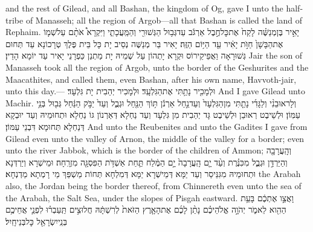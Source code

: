 {and the rest of Gilead, and all Bashan, the kingdom of Og, gave I unto the half-tribe of Manasseh; all the region of Argob—all that Bashan is called the land of Rephaim.}{}
{יָאִ֣יר בֶּן\maqqaf מְנַשֶּׁ֗ה לָקַח֙ אֶת\maqqaf כׇּל\maqqaf חֶ֣בֶל אַרְגֹּ֔ב עַד\maqqaf גְּב֥וּל הַגְּשׁוּרִ֖י וְהַמַּֽעֲכָתִ֑י וַיִּקְרָא֩ אֹתָ֨ם עַל\maqqaf שְׁמ֤וֹ אֶת\maqqaf הַבָּשָׁן֙ חַוֺּ֣ת יָאִ֔יר עַ֖ד הַיּ֥וֹם הַזֶּֽה׃}
{יָאִיר בַּר מְנַשֶּׁה נְסֵיב יָת כָּל בֵּית פֶּלֶךְ טְרָכוֹנָא עַד תְּחוּם גְּשׁוּרָאָה וַאֲפֵיקֵירוֹס וּקְרָא יָתְהוֹן עַל שְׁמֵיהּ יָת מַתְנַן כַּפְרָנֵי יָאִיר עַד יוֹמָא הָדֵין׃}
{Jair the son of Manasseh took all the region of Argob, unto the border of the Geshurites and the Maacathites, and called them, even Bashan, after his own name, Havvoth-jair, unto this day.—}{}
{וּלְמָכִ֖יר נָתַ֥תִּי אֶת\maqqaf הַגִּלְעָֽד׃}
{וּלְמָכִיר יְהַבִית יָת גִּלְעָד׃}
{And I gave Gilead unto Machir.}{}
{וְלָראוּבֵנִ֨י וְלַגָּדִ֜י נָתַ֤תִּי מִן\maqqaf הַגִּלְעָד֙ וְעַד\maqqaf נַ֣חַל אַרְנֹ֔ן תּ֥וֹךְ הַנַּ֖חַל וּגְבֻ֑ל וְעַד֙ יַבֹּ֣ק הַנַּ֔חַל גְּב֖וּל בְּנֵ֥י עַמּֽוֹן׃}
{וּלְשֵׁיבֶט רְאוּבֵן וּלְשֵׁיבֶט גָּד יְהַבִית מִן גִּלְעָד וְעַד נַחְלָא דְּאַרְנוֹן גּוֹ נַחְלָא וּתְחוּמֵיהּ וְעַד יוּבְקָא דְּנַחְלָא תְּחוּמָא דִּבְנֵי עַמּוֹן׃}
{And unto the Reubenites and unto the Gadites I gave from Gilead even unto the valley of Arnon, the middle of the valley for a border; even unto the river Jabbok, which is the border of the children of Ammon;}{}
{וְהָֽעֲרָבָ֖ה וְהַיַּרְדֵּ֣ן וּגְבֻ֑ל מִכִּנֶּ֗רֶת וְעַ֨ד יָ֤ם הָֽעֲרָבָה֙ יָ֣ם הַמֶּ֔לַח תַּ֛חַת אַשְׁדֹּ֥ת הַפִּסְגָּ֖ה מִזְרָֽחָה׃}
{וּמֵישְׁרָא וְיַרְדְּנָא וּתְחוּמֵיהּ מִגִּנֵּיסַר וְעַד יַמָּא דְּמֵישְׁרָא יַמָּא דְּמִלְחָא תְּחוֹת מַשְׁפַּךְ מֵי רָמְתָא מַדְנְחָא׃}
{the Arabah also, the Jordan being the border thereof, from Chinnereth even unto the sea of the Arabah, the Salt Sea, under the slopes of Pisgah eastward.}{}
{וָאֲצַ֣ו אֶתְכֶ֔ם בָּעֵ֥ת הַהִ֖וא לֵאמֹ֑ר יְהֹוָ֣ה אֱלֹהֵיכֶ֗ם נָתַ֨ן לָכֶ֜ם אֶת\maqqaf הָאָ֤רֶץ הַזֹּאת֙ לְרִשְׁתָּ֔הּ חֲלוּצִ֣ים תַּֽעַבְר֗וּ לִפְנֵ֛י אֲחֵיכֶ֥ם בְּנֵֽי\maqqaf יִשְׂרָאֵ֖ל כׇּל\maqqaf בְּנֵי\maqqaf חָֽיִל׃}
